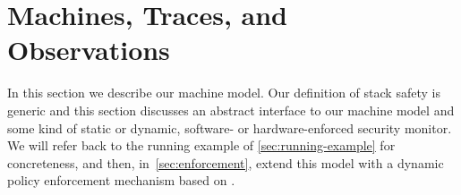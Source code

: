 \documentclass[acmsmall,review,anonymous]{acmart}\settopmatter{printfolios=true,printccs=false,printacmref=false}
\begin{document}
%
%
%
%
%
%
%
%
%

\section{Machines, Traces, and Observations}
\label{sec:prelim}

In this section we describe our machine model. Our definition of stack
safety is generic and this section discusses an abstract interface to
our machine model and some kind of static or dynamic, software- or
hardware-enforced security monitor. We will refer back to the running
example of \cref{sec:running-example} for concreteness, and then,
in~\cref{sec:enforcement}, extend this model with a dynamic policy
enforcement mechanism based on
\citet{DBLP:conf/sp/RoesslerD18}.
\end{document}
